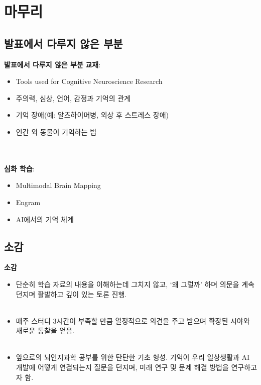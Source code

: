 \documentclass{beamer}
\begin{document}
\section{마무리}
\subsection{발표에서 다루지 않은 부분}
\begin{frame}{\textbf{발표에서 다루지 않은 부분}}
  \large
  \textbf{교재}:
  \begin{itemize}
    \item Tools used for Cognitive Neuroscience Research
    \item 주의력, 심상, 언어, 감정과 기억의 관계
    \item 기억 장애(예: 알츠하이머병, 외상 후 스트레스 장애)
    \item 인간 외 동물이 기억하는 법
  \end{itemize}\\~\\

  \textbf{심화 학습}:
  \begin{itemize}
    \item Multimodal Brain Mapping
    \item Engram
    \item AI에서의 기억 체계
  \end{itemize}
\end{frame}

\subsection{소감}
\begin{frame}{\textbf{소감}}
  \begin{itemize}
    \large
    \item 단순히 학습 자료의 내용을 이해하는데 그치지 않고, `왜 그럴까' 하며 의문을 계속 던지며 활발하고 깊이 있는 토론 진행.\\~\\
    \item 매주 스터디 3시간이 부족할 만큼 열정적으로 의견을 주고 받으며 확장된 시야와 새로운 통찰을 얻음.\\~\\
    \item 앞으로의 뇌인지과학 공부를 위한 탄탄한 기초 형성. 기억이 우리 일상생활과 AI 개발에 어떻게 연결되는지 질문을 던지며, 미래 연구 및 문제 해결 방법을 연구하고자 함.
  \end{itemize}
\end{frame}
\end{document}
